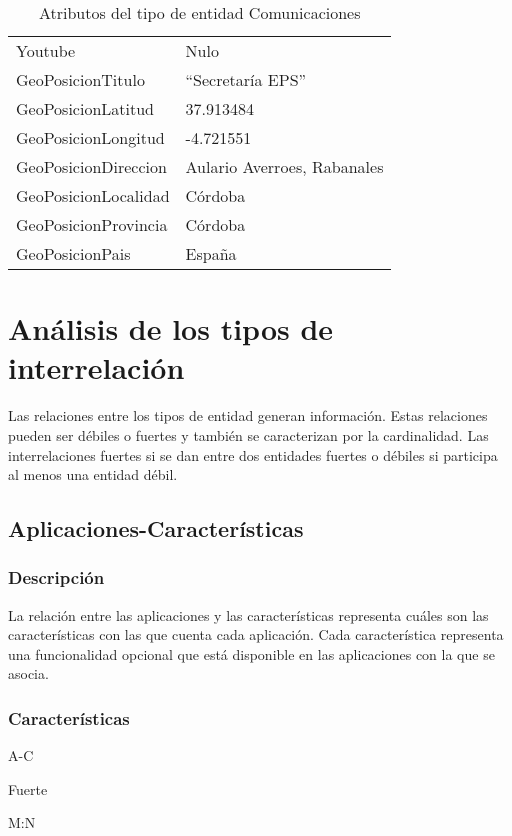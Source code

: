 \begin{table}[h!]
\begin{tabular}{|ll|}
        Youtube & Nulo \\
        GeoPosicionTitulo & ``Secretaría EPS'' \\
        GeoPosicionLatitud & 37.913484 \\
        GeoPosicionLongitud & -4.721551 \\
        GeoPosicionDireccion & Aulario Averroes, Rabanales \\
        GeoPosicionLocalidad & Córdoba \\
        GeoPosicionProvincia & Córdoba \\
        GeoPosicionPais & España \\
        \hline
    \end{tabular}%
    \caption{Atributos del tipo de entidad Comunicaciones}
    \label{cuadro:ejemplo-comunicacion}
\end{table}

\section {Análisis de los tipos de interrelación}
Las relaciones entre los tipos de entidad generan información. Estas relaciones pueden ser débiles o fuertes y también se caracterizan por la cardinalidad.
Las interrelaciones fuertes si se dan entre dos entidades fuertes o débiles si participa al menos una entidad débil.

\subsection{Aplicaciones-Características}
\subsubsection*{Descripción}
La relación entre las aplicaciones y las características representa cuáles son las características con las que cuenta cada aplicación. Cada característica representa una funcionalidad opcional que está disponible en las aplicaciones con la que se asocia.

\subsubsection*{Características}
\begin{description}[nosep,style=multiline,labelindent=0.8cm,leftmargin=4.5cm,font=\normalfont]
    \item[Nombre] A-C
    \item[Tipo] Fuerte
    \item[Cardinalidad] M:N
\end{description}


